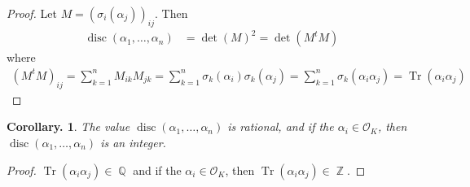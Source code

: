 \documentclass[11pt, a4paper]{memoir}
\DeclareMathOperator{\Q}{{\mathbb{Q}}}
\DeclareMathOperator{\Z}{{\mathbb{Z}}}
\theoremstyle{change}
\newtheorem{corollary}[theorem]{Corollary.}
\theoremstyle{plain}
\theoremstyle{nonumberplain}
\newtheorem{proof}{Proof}
\DeclareMathOperator{\disc}{disc}
\DeclareMathOperator{\Tr}{Tr}
\begin{document}
\begin{proof}
    Let $M=(\sigma_i(\alpha_j))_{ij}$.
    Then
    \begin{align*}
        \disc(\alpha_1,\ldots,\alpha_n) &= \det(M)^2 = \det(M^tM)
    \end{align*}
    where
    \begin{align*}
        \left(M^tM\right)_{ij} =\sum_{k=1}^n M_{ik}M_{jk}=\sum_{k=1}^n\sigma_k(\alpha_i)\sigma_k(\alpha_j)=\sum_{k=1}^n\sigma_k(\alpha_i\alpha_j)=\Tr(\alpha_i\alpha_j)
    \end{align*}
\end{proof}
\begin{corollary}
    The value $\disc(\alpha_1,\ldots,\alpha_n)$ is rational, and if the $\alpha_i\in\mathcal{O}_K$, then $\disc(\alpha_1,\ldots,\alpha_n)$ is an integer.
\end{corollary}
\begin{proof}
    $\Tr(\alpha_i\alpha_j)\in\Q$ and if the $\alpha_i\in\mathcal{O}_K$, then $\Tr(\alpha_i\alpha_j)\in\Z$.
\end{proof}
\end{document}
